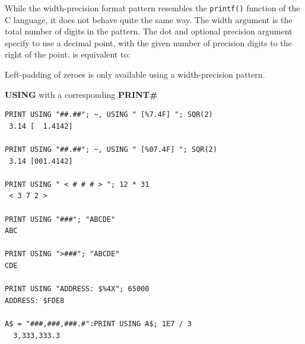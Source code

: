 \begin{description}[leftmargin=2cm,style=nextline]
                  While the width-precision format pattern resembles the \texttt{printf()} function of the C language, it does not behave quite the same way. The width argument is the total number of digits in the pattern. The dot and optional precision argument specify to use a decimal point, with the given number of precision digits to the right of the point.  is equivalent to: 

                  Left-padding of zeroes is only available using a width-precision pattern.

\item [Examples:] {\bf USING} with a corresponding {\bf PRINT\#}

\begin{tcolorbox}[colback=black,coltext=white]
\verbatimfont{\codefont}
\begin{verbatim}
PRINT USING "##.##"; ~, USING " [%7.4F] "; SQR(2)
 3.14 [  1.4142]

PRINT USING "##.##"; ~, USING " [%07.4F] "; SQR(2)
 3.14 [001.4142]

PRINT USING " < # # # > "; 12 * 31
 < 3 7 2 >

PRINT USING "###"; "ABCDE"
ABC

PRINT USING ">###"; "ABCDE"
CDE

PRINT USING "ADDRESS: $%4X"; 65000
ADDRESS: $FDE8

A$ = "###,###,###.#":PRINT USING A$; 1E7 / 3
  3,333,333.3
\end{verbatim}
\end{tcolorbox}
\end{description}


\newpage
